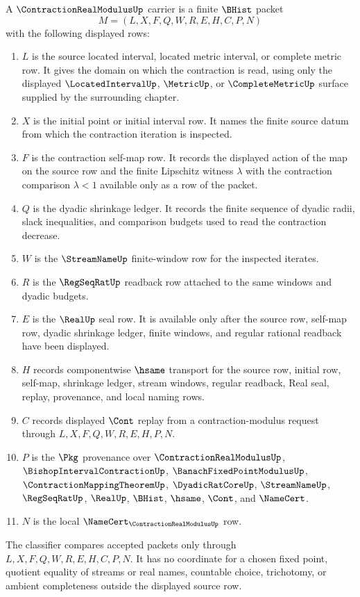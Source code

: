 \begin{definition}\label{def:contraction-real-modulus-carrier}
A $\ContractionRealModulusUp$ carrier is a finite $\BHist$ packet
$$
M=(L,X,F,Q,W,R,E,H,C,P,N)
$$
with the following displayed rows:
\begin{enumerate}
\item $L$ is the source located interval, located metric interval, or complete metric row. It gives the domain on which the contraction is read, using only the displayed $\LocatedIntervalUp$, $\MetricUp$, or $\CompleteMetricUp$ surface supplied by the surrounding chapter.
\item $X$ is the initial point or initial interval row. It names the finite source datum from which the contraction iteration is inspected.
\item $F$ is the contraction self-map row. It records the displayed action of the map on the source row and the finite Lipschitz witness $\lambda$ with the contraction comparison $\lambda < 1$ available only as a row of the packet.
\item $Q$ is the dyadic shrinkage ledger. It records the finite sequence of dyadic radii, slack inequalities, and comparison budgets used to read the contraction decrease.
\item $W$ is the $\StreamNameUp$ finite-window row for the inspected iterates.
\item $R$ is the $\RegSeqRatUp$ readback row attached to the same windows and dyadic budgets.
\item $E$ is the $\RealUp$ seal row. It is available only after the source row, self-map row, dyadic shrinkage ledger, finite windows, and regular rational readback have been displayed.
\item $H$ records componentwise $\hsame$ transport for the source row, initial row, self-map, shrinkage ledger, stream windows, regular readback, Real seal, replay, provenance, and local naming rows.
\item $C$ records displayed $\Cont$ replay from a contraction-modulus request through $L,X,F,Q,W,R,E,H,P,N$.
\item $P$ is the $\Pkg$ provenance over $\ContractionRealModulusUp$, $\BishopIntervalContractionUp$, $\BanachFixedPointModulusUp$, $\ContractionMappingTheoremUp$, $\DyadicRatCoreUp$, $\StreamNameUp$, $\RegSeqRatUp$, $\RealUp$, $\BHist$, $\hsame$, $\Cont$, and $\NameCert$.
\item $N$ is the local $\NameCert_{\ContractionRealModulusUp}$ row.
\end{enumerate}
The classifier compares accepted packets only through $L,X,F,Q,W,R,E,H,C,P,N$. It has no coordinate for a chosen fixed point, quotient equality of streams or real names, countable choice, trichotomy, or ambient completeness outside the displayed source row.
\end{definition}

